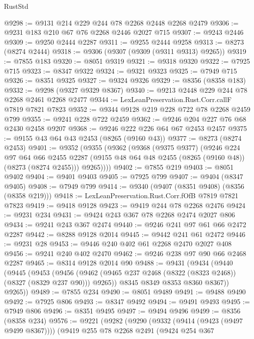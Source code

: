 \begin{lexlean}{RustStd}
\begin{coremodule}
@9298 := @9131 @214 @229 @244 @78 @2268 @2448 @2268 @2479
@9306 := @9231 @183 @210 @67 @76 @2268 @2446 @2027 @715
@9307 := @9243 @2446
@9309 := @9250 @2444 @2287
@9311 := @9255 @2444 @9258
@9313 := @8273 (@8274 @2444)
@9318 := @9306 (@9307 (@9309 (@9311 @9313) @9265))
@9319 := @7855 @183
@9320 := @8051 @9319
@9321 := @9318 @9320
@9322 := @7925 @715
@9323 := @8347 @9322
@9324 := @9321 @9323
@9325 := @7949 @715
@9326 := @8351 @9325
@9327 := @9324 @9326
@9329 := @8356 (@8358 @183)
@9332 := @9298 (@9327 @9329 @8367)
@9340 := @9213 @2448 @229 @244 @78 @2268 @2461 @2268 @2477
@9344 := LexLeanPreservation.Rust.Corr.callF @7819 @7821 @7823
@9352 := @9344 @9128 @219 @228 @722 @78 @2268 @2459 @799
@9355 := @9241 @228 @722 @2459
@9362 := @9246 @204 @227 @76 @68 @2430 @2458 @9207
@9368 := @9246 @222 @226 @64 @67 @2453 @2457
@9375 := @9155 @43 @64 @43 @2453 (@8265 (@9160 @43))
@9377 := @8273 (@8274 @2453)
@9401 := @9352
    (@9355
      (@9362
        (@9368
          (@9375 @9377)
          (@9246
            @224
            @97
            @64
            @66
            @2455
            @2287
            (@9155 @48 @64 @48 @2455 (@8265 (@9160 @48)) (@8273 (@8274 @2455)))
            @9265))))
@9402 := @7855 @219
@9403 := @8051 @9402
@9404 := @9401 @9403
@9405 := @7925 @799
@9407 := @9404 (@8347 @9405)
@9408 := @7949 @799
@9414 := @9340 (@9407 (@8351 @9408) (@8356 (@8358 @219)))
@9418 := LexLeanPreservation.Rust.Corr.fOfB @7819 @7821 @7823
@9419 := @9418 @9128
@9423 := @9419 @244 @78 @2268 @2476
@9424 := @9231 @234
@9431 := @9424 @243 @367 @78 @2268 @2474 @2027 @806
@9434 := @9241 @243 @367 @2474
@9440 := @9246 @241 @97 @61 @66 @2472 @2287
@9442 := @8288 @9128 @2014
@9445 := @9442 @241 @61 @2472
@9446 := @9231 @28
@9453 := @9446 @240 @402 @61 @2268 @2470 @2027 @408
@9456 := @9241 @240 @402 @2470
@9462 := @9246 @238 @97 @90 @66 @2468 @2287
@9465 := @8314 @9128 @2014 @90
@9488 := @9431
    (@9434
      (@9440
        (@9445
          (@9453
            (@9456 (@9462 (@9465 @237 @2468 (@8322 (@8323 @2468)) (@8327 (@8329 @237 @90))) @9265))
            @8345
            @8349
            @8353
            @8360
            @8367))
        @9265))
@9489 := @7855 @234
@9490 := @8051 @9489
@9491 := @9488 @9490
@9492 := @7925 @806
@9493 := @8347 @9492
@9494 := @9491 @9493
@9495 := @7949 @806
@9496 := @8351 @9495
@9497 := @9494 @9496
@9499 := @8356 (@8358 @234)
@9576 := @9221
    (@9282
      (@9290
        (@9332 (@9414 (@9423 (@9497 @9499 @8367))))
        (@9419
          @255
          @78
          @2268
          @2491
          (@9424
            @254
            @367

\end{coremodule}
\end{lexlean}
